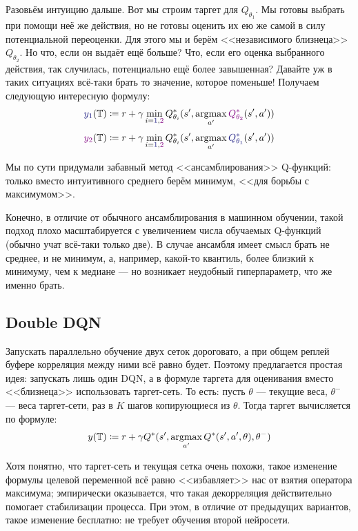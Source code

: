 Разовьём интуицию дальше. Вот мы строим таргет для $Q_{\theta_1}$. Мы готовы выбрать при помощи неё же действия, но не готовы оценить их ею же самой в силу потенциальной переоценки. Для этого мы и берём <<независимого близнеца>> $Q_{\theta_2}$. Но что, если он выдаёт ещё больше? Что, если его оценка выбранного действия, так случилась, потенциально ещё более завышенная? Давайте уж в таких ситуациях всё-таки брать то значение, которое поменьше! Получаем следующую интересную формулу:
$$\textcolor{ChadBlue}{y_1}(\T ) \coloneqq r + \gamma \min_{i = \textcolor{ChadBlue}{1}, \textcolor{ChadPurple}{2}}Q_{\theta_i}^*(s', \argmax\limits_{a'} \textcolor{ChadPurple}{Q_{\theta_2}^*}(s', a'))$$
$$\textcolor{ChadPurple}{y_2}(\T ) \coloneqq r + \gamma \min_{i = \textcolor{ChadBlue}{1}, \textcolor{ChadPurple}{2}}Q_{\theta_i}^*(s', \argmax\limits_{a'} \textcolor{ChadBlue}{Q_{\theta_1}^*}(s', a'))$$

Мы по сути придумали забавный метод <<ансамблирования>> Q-функций: только вместо интуитивного среднего берём минимум, <<для борьбы с максимумом>>. 

\begin{remark}
Конечно, в отличие от обычного ансамблирования в машинном обучении, такой подход плохо масштабируется с увеличением числа обучаемых Q-функций (обычно учат всё-таки только две). В случае ансамбля имеет смысл брать не среднее, и не минимум, а, например, какой-то квантиль, более близкий к минимуму, чем к медиане --- но возникает неудобный гиперпараметр, что же именно брать.
\end{remark}

\subsection{Double DQN}\label{subsec:doubledqn}

Запускать параллельно обучение двух сеток дороговато, а при общем реплей буфере корреляция между ними всё равно будет. Поэтому предлагается простая идея: запускать лишь один DQN, а в формуле таргета для оценивания вместо <<близнеца>> использовать таргет-сеть. То есть: пусть $\theta$ --- текущие веса, $\theta^{-}$ --- веса таргет-сети, раз в $K$ шагов копирующиеся из $\theta$. Тогда таргет вычисляется по формуле:
$$y(\mathbb{T} ) \coloneqq r + \gamma Q^*(s', \mathop{\mathrm{argmax}}\limits_{a'} Q^*(s', a', \theta), \theta^-)$$

Хотя понятно, что таргет-сеть и текущая сетка очень похожи, такое изменение формулы целевой переменной всё равно <<избавляет>> нас от взятия оператора максимума; эмпирически оказывается, что такая декорреляция действительно помогает стабилизации процесса. При этом, в отличие от предыдущих вариантов, такое изменение бесплатно: не требует обучения второй нейросети.

